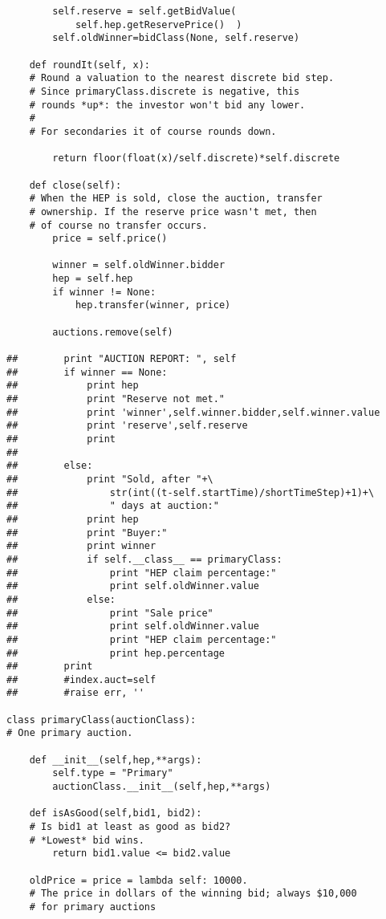 \begin{lstlisting}
        self.reserve = self.getBidValue(
            self.hep.getReservePrice()  )
        self.oldWinner=bidClass(None, self.reserve)

    def roundIt(self, x):
    # Round a valuation to the nearest discrete bid step.
    # Since primaryClass.discrete is negative, this
    # rounds *up*: the investor won't bid any lower.
    #
    # For secondaries it of course rounds down.

        return floor(float(x)/self.discrete)*self.discrete

    def close(self):
    # When the HEP is sold, close the auction, transfer
    # ownership. If the reserve price wasn't met, then
    # of course no transfer occurs.
        price = self.price()

        winner = self.oldWinner.bidder
        hep = self.hep
        if winner != None:
            hep.transfer(winner, price)

        auctions.remove(self)

##        print "AUCTION REPORT: ", self
##        if winner == None:
##            print hep
##            print "Reserve not met."
##            print 'winner',self.winner.bidder,self.winner.value
##            print 'reserve',self.reserve
##            print 
##            
##        else:
##            print "Sold, after "+\
##                str(int((t-self.startTime)/shortTimeStep)+1)+\
##                " days at auction:"
##            print hep
##            print "Buyer:"
##            print winner
##            if self.__class__ == primaryClass:
##                print "HEP claim percentage:"
##                print self.oldWinner.value
##            else:
##                print "Sale price"
##                print self.oldWinner.value
##                print "HEP claim percentage:"
##                print hep.percentage
##        print
##        #index.auct=self
##        #raise err, ''
        
class primaryClass(auctionClass):
# One primary auction.

    def __init__(self,hep,**args):
        self.type = "Primary"
        auctionClass.__init__(self,hep,**args)

    def isAsGood(self,bid1, bid2):
    # Is bid1 at least as good as bid2?
    # *Lowest* bid wins.
        return bid1.value <= bid2.value
    
    oldPrice = price = lambda self: 10000.
    # The price in dollars of the winning bid; always $10,000
    # for primary auctions


\end{lstlisting}

